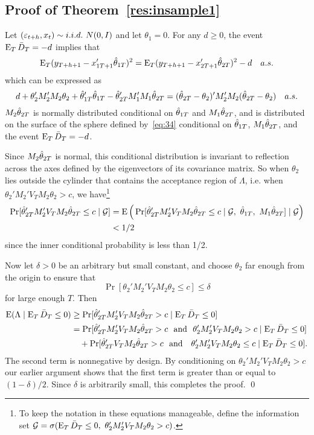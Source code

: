 \subsection{Proof of Theorem~\ref{res:insample1}}

Let $(\e_{t+h}, x_{t}) \sim i.i.d.\ N(0,I)$ and let $\theta_1 = 0$.
For any $d \geq 0$, the event $\operatorname{E}_T \bar{D}_{T} = -d$ implies that
\begin{equation*}
  \operatorname{E}_T (y_{T+h+1} - x_{1T+1}'\hat\theta_{1T})^2
  = \operatorname{E}_T (y_{T+h+1} - x_{2T+1}'\hat\theta_{2T})^2 - d \quad a.s.
\end{equation*}
which can be expressed as
\begin{equation}\label{eq:34}
  d + \theta_2'M_2' M_2 \theta_2 + \hat\theta_{1T}'\hat\theta_{1T} - \hat\theta_{2T}'M_1'M_1\hat\theta_{2T}
  = (\hat\theta_{2T} - \theta_2)' M_2'M_2 (\hat\theta_{2T} - \theta_2) \quad a.s.
\end{equation}
$M_2 \hat\theta_{2T}$ is normally distributed conditional on $\hat\theta_{1T}$ and
$M_1 \hat\theta_{2T}$, and is distributed on the surface of the sphere defined
by~\eqref{eq:34} conditional on $\hat\theta_{1T}$, $M_1 \hat\theta_{2T}$, and the
event $\operatorname{E}_T \bar{D}_{T} = -d$.

Since $M_2 \hat\theta_{2T}$ is normal, this conditional distribution is
invariant to reflection across the axes defined by the eigenvectors of
its covariance matrix. So when $\theta_2$ lies outside the cylinder
that contains the acceptance region of $\Lambda$, i.e. when
$\theta_2'M_2' V_T M_2 \theta_2 > c$, we have\footnote{%
  To keep the notation in these equations manageable, define the
  information set
  $\mathcal{G} = \sigma(\operatorname{E}_T \bar{D}_{T} \leq 0,~ \theta_2'M_2' V_T M_2 \theta_2 >
  c)$.} %
\begin{align*}
  \Pr[ \hat\theta_{2T}' M_2' V_T M_2 \hat\theta_{2T} \leq c \mid \mathcal{G}]
  &= \operatorname{E}\Big( \Pr[ \hat\theta_{2T}'M_2' V_T M_2 \hat\theta_{2T} \leq c \mid \mathcal{G},~\hat\theta_{1T},~M_1 \hat\theta_{2T}] \mid \mathcal{G} \Big) \\
  & < 1/2
\end{align*}
since the inner conditional probability is less than 1/2.

Now let $\delta > 0$ be an arbitrary but small constant, and choose
$\theta_2$ far enough from the origin to ensure that
\begin{equation*}
  \Pr[\theta_2'M_2' V_T M_2 \theta_2 \leq c] \leq \delta
\end{equation*}
for large enough $T$. Then
\begin{align*}
  \operatorname{E}(\Lambda \mid \operatorname{E}_T \bar{D}_{T} \leq 0) &
  \geq \Pr[\hat\theta_{2T}' M_2' V_T M_2 \hat\theta_{2T} > c \mid \operatorname{E}_T \bar{D}_{T} \leq 0] \\
  &= \Pr[\hat\theta_{2T}' M_2' V_T M_2 \hat\theta_{2T} > c \text{~~and~~}
  \theta_2'M_2' V_T M_2 \theta_2 > c \mid \operatorname{E}_T \bar{D}_{T}  \leq 0] \\
  & \quad + \Pr[\hat\theta_{2T}' V_T M_2 \hat\theta_{2T} > c \text{~~and~~ }
  \theta_2'M_2' V_T M_2 \theta_2 \leq c \mid \operatorname{E}_T \bar{D}_{T} \leq 0].
\end{align*}
The second term is nonnegative by design. By conditioning on
$\theta_2'M_2' V_T M_2 \theta_2 > c$ our earlier argument shows that
the first term is greater than or equal to $(1 - \delta) / 2$. Since
$\delta$ is arbitrarily small, this completes the proof.
\qed

